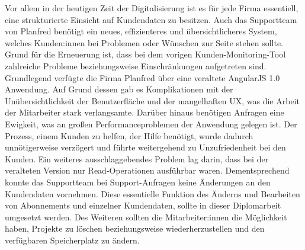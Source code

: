 Vor allem in der heutigen Zeit der Digitalisierung ist es f\"ur jede Firma essentiell, eine strukturierte Einsicht auf Kundendaten zu besitzen. Auch das Supportteam von Planfred benötigt ein neues, effizienteres und \"ubersichtlicheres System, welches Kunden:innen bei Problemen oder W\"unschen zur Seite stehen sollte. Grund für die Erneuerung ist, dass bei dem vorigen Kunden-Monitoring-Tool zahlreiche Probleme beziehungsweise Einschränkungen aufgetreten sind.
\newline
Grundlegend verf\"ugte die Firma Planfred \"uber eine veraltete AngularJS 1.0 Anwendung. Auf Grund dessen gab es Komplikationen mit der Un\"ubersichtlichkeit der Benutzerfläche und der mangelhaften UX, was die Arbeit der Mitarbeiter stark verlangsamte. Dar\"uber hinaus benötigen Anfragen eine Ewigkeit, was an großen Performanceproblemen der Anwendung gelegen ist. Der Prozess, einem Kunden zu helfen, der Hilfe benötigt, wurde dadurch unnötigerweise verzögert und f\"uhrte weitergehend zu Unzufriedenheit bei den Kunden.
\newline
Ein weiteres ausschlaggebendes Problem lag darin, dass bei der veralteten Version nur Read-Operationen ausf\"uhrbar waren. Dementsprechend konnte das Supportteam bei Support-Anfragen keine Änderungen an den Kundendaten vornehmen. Diese essentielle Funktion des Änderns und Bearbeiten von Abonnements und einzelner Kundendaten, sollte in dieser Diplomarbeit umgesetzt werden. Des Weiteren sollten die Mitarbeiter:innen die Möglichkeit haben, Projekte zu löschen beziehungsweise wiederherzustellen und den verf\"ugbaren Speicherplatz zu ändern.